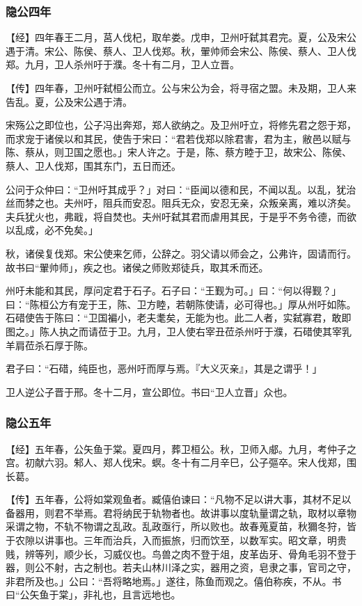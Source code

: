 \documentclass[]{article}
\begin{document}
\hypertarget{header-n53}{%
\subsubsection{隐公四年 }\label{header-n53}}

【经】四年春王二月，莒人伐杞，取牟娄。戊申，卫州吁弑其君完。夏，公及宋公遇于清。宋公、陈侯、蔡人、卫人伐郑。秋，翬帅师会宋公、陈侯、蔡人、卫人伐郑。九月，卫人杀州吁于濮。冬十有二月，卫人立晋。

【传】四年春，卫州吁弑桓公而立。公与宋公为会，将寻宿之盟。未及期，卫人来告乱。夏，公及宋公遇于清。

宋殇公之即位也，公子冯出奔郑，郑人欲纳之。及卫州吁立，将修先君之怨于郑，而求宠于诸侯以和其民，使告于宋曰：``君若伐郑以除君害，君为主，敝邑以赋与陈、蔡从，则卫国之愿也。」宋人许之。于是，陈、蔡方睦于卫，故宋公、陈侯、蔡人、卫人伐郑，围其东门，五日而还。

公问于众仲曰：``卫州吁其成乎？」对曰：``臣闻以德和民，不闻以乱。以乱，犹治丝而棼之也。夫州吁，阻兵而安忍。阻兵无众，安忍无亲，众叛亲离，难以济矣。夫兵犹火也，弗戢，将自焚也。夫州吁弑其君而虐用其民，于是乎不务令德，而欲以乱成，必不免矣。」

秋，诸侯复伐郑。宋公使来乞师，公辞之。羽父请以师会之，公弗许，固请而行。故书曰``翬帅师」，疾之也。诸侯之师败郑徒兵，取其禾而还。

州吁未能和其民，厚问定君于石子。石子曰：``王觐为可。」曰：``何以得觐？」曰：``陈桓公方有宠于王，陈、卫方睦，若朝陈使请，必可得也。」厚从州吁如陈。石碏使告于陈曰：``卫国褊小，老夫耄矣，无能为也。此二人者，实弑寡君，敢即图之。」陈人执之而请莅于卫。九月，卫人使右宰丑莅杀州吁于濮，石碏使其宰乳羊肩莅杀石厚于陈。

君子曰：``石碏，纯臣也，恶州吁而厚与焉。『大义灭亲』，其是之谓乎！」

卫人逆公子晋于邢。冬十二月，宣公即位。书曰``卫人立晋」众也。

\hypertarget{header-n64}{%
\subsubsection{隐公五年 }\label{header-n64}}

【经】五年春，公矢鱼于棠。夏四月，葬卫桓公。秋，卫师入郕。九月，考仲子之宫。初献六羽。邾人、郑人伐宋。螟。冬十有二月辛巳，公子彄卒。宋人伐郑，围长葛。

【传】五年春，公将如棠观鱼者。臧僖伯谏曰：``凡物不足以讲大事，其材不足以备器用，则君不举焉。君将纳民于轨物者也。故讲事以度轨量谓之轨，取材以章物采谓之物，不轨不物谓之乱政。乱政亟行，所以败也。故春蒐夏苗，秋獮冬狩，皆于农隙以讲事也。三年而治兵，入而振旅，归而饮至，以数军实。昭文章，明贵贱，辨等列，顺少长，习威仪也。鸟兽之肉不登于俎，皮革齿牙、骨角毛羽不登于器，则公不射，古之制也。若夫山林川泽之实，器用之资，皂隶之事，官司之守，非君所及也。」公曰：``吾将略地焉。」遂往，陈鱼而观之。僖伯称疾，不从。书曰``公矢鱼于棠」，非礼也，且言远地也。
\end{document}
